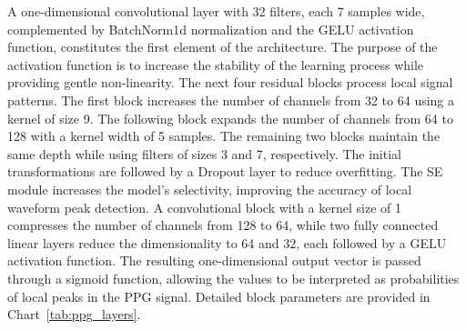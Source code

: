 \documentclass[journal]{IEEEtran}
\begin{document}
A one-dimensional convolutional layer with 32 filters, each 7 samples wide, complemented by BatchNorm1d normalization and the GELU activation function, constitutes the first element of the architecture. The purpose of the activation function is to increase the stability of the learning process while providing gentle non-linearity. The next four residual blocks process local signal patterns. The first block increases the number of channels from 32 to 64 using a kernel of size 9. The following block expands the number of channels from 64 to 128 with a kernel width of 5 samples. The remaining two blocks maintain the same depth while using filters of sizes 3 and 7, respectively. The initial transformations are followed by a Dropout layer to reduce overfitting.
\newpage
The SE module increases the model’s selectivity, improving the accuracy of local waveform peak detection. A convolutional block with a kernel size of 1 compresses the number of channels from 128 to 64, while two fully connected linear layers reduce the dimensionality to 64 and 32, each followed by a GELU activation function. The resulting one-dimensional output vector is passed through a sigmoid function, allowing the values to be interpreted as probabilities of local peaks in the PPG signal. Detailed block parameters are provided in Chart~\ref{tab:ppg_layers}.
\end{document}
